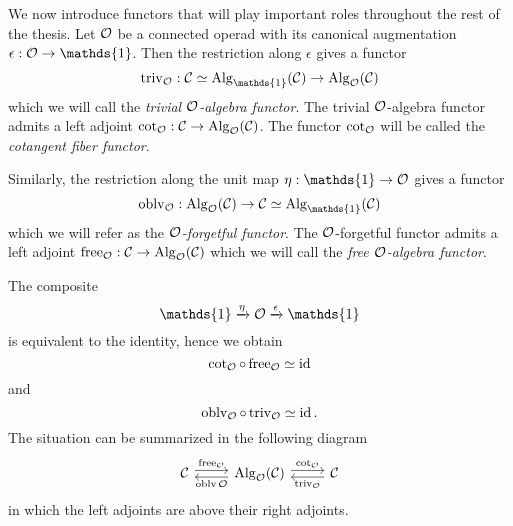 We now introduce functors that will play important roles throughout the rest of the thesis. 
Let ${\mathcal{O}}$ be a connected operad with its canonical augmentation $\epsilon:\CO\rightarrow \mathds{1}$.
Then the restriction along $\epsilon$ gives a functor 
$$
\trivial_{\CO}: \CC\simeq\Alg_{\mathds{1}}(\CC)\rightarrow \Alg_{\CO}(\CC)
$$
which we will call the \emph{trivial ${\mathcal{O}}$-algebra functor}.
The trivial ${\mathcal{O}}$-algebra functor admits a left adjoint $\cot_{{\mathcal{O}}}:{\mathcal{C}}\rightarrow \operatorname{Alg}_{{\mathcal{O}}}({\mathcal{C}})$. The functor $\cot_{{\mathcal{O}}}$ will be called the \emph{cotangent fiber functor}.

Similarly, the restriction along the unit map $\eta:\mathds{1}\rightarrow \CO$ gives a functor
$$
\oblv_{\CO}: \Alg_{\CO}(\CC)
\rightarrow 
\CC\simeq\Alg_{\mathds{1}}(\CC)$$
which we will refer as the \emph{${\mathcal{O}}$-forgetful functor}.
The ${\mathcal{O}}$-forgetful functor admits a left adjoint $\operatorname{free}_{{\mathcal{O}}}:{\mathcal{C}}\rightarrow \operatorname{Alg}_{{\mathcal{O}}}({\mathcal{C}})$ which we will call the \emph{free ${\mathcal{O}}$-algebra functor}.
    
The composite
$$
\mathds{1}\xrightarrow{\eta} \CO \xrightarrow{\epsilon} \mathds{1}
$$
is equivalent to the identity, hence we obtain
$$
\cot_{{\mathcal{O}}} \circ \operatorname{free}_{{\mathcal{O}}} \simeq \operatorname{id}
$$
and 
$$
\operatorname{oblv}_{{\mathcal{O}}}\circ \operatorname{triv}_{{\mathcal{O}}} \simeq \operatorname{id}.
$$
The situation can be summarized in the following diagram
\[
\begin{tikzcd}
\CC & \Alg_{\CO}(\CC) & \CC
	\arrow[from=1-1, to= 1-2, shift left = 1, "\Free_{\CO}" above]
	\arrow[from=1-2, to=1-1, shift left = 1, "\oblv{\CO}" below]
	\arrow[from=1-2, to= 1-3, shift left = 1, "\cot_{\CO}" above]
	\arrow[from=1-3, to=1-2, shift left = 1, "\trivial_{\CO}" below]
\end{tikzcd}
\]
in which the left adjoints are above their right adjoints.

